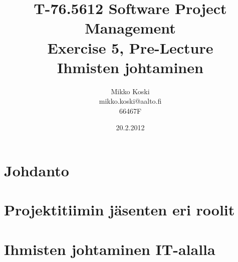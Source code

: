 \documentclass[a4paper]{article}
\begin{document}
\title{\small T-76.5612 Software Project Management \\ Exercise 5, Pre-Lecture \\ \huge Ihmisten johtaminen}
\date{20.2.2012}
\author{Mikko Koski \\ mikko.koski@aalto.fi \\ 66467F}
\maketitle

\normalsize

\section{Johdanto}

\section{Projektitiimin jäsenten eri roolit}





\section{Ihmisten johtaminen IT-alalla}



\citep{grosjean2010}
\citep{appelo2012}
\citep{rsaanimate}
\citep{adkins2010}
\citep{augustine2005}
\citep{mcconnell1996}



\end{document}
